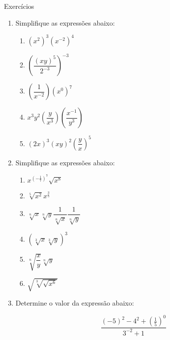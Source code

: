 \documentclass[14pt, aspectratio=169]{beamer}
\newcommand{\skipframe}{\vspace{10.0cm}}
\newcommand{\parenthesis}[1]{\left( #1 \right)}
\begin{document}
\begin{frame}[allowframebreaks]{Exercícios}
    \begin{enumerate}
        \item Simplifique as expressões abaixo:

        \begin{multicols}{2}
            \begin{enumerate}[a]
                \item $\parenthesis{x^2}^3 \parenthesis{x^{-2}}^4$
                \item $\parenthesis{\dfrac{\parenthesis{xy}^5}{2^{-3}}}^{-3}$
                \item $\parenthesis{\dfrac{1}{x^{-2}}} \parenthesis{x^0}^7$
                \item $x^3 y^2 \parenthesis{\dfrac{y}{x^3}} \parenthesis{\dfrac{x^{-1}}{y^3}}$
                \item $\parenthesis{2x}^3 \parenthesis{xy}^2 \parenthesis{\dfrac{y}{x}}^5$
            \end{enumerate}
        \end{multicols}

        \skipframe

        \item Simplifique as expressões abaixo:

        \begin{multicols}{2}
            \begin{enumerate}[a]
                \item $x^{\parenthesis{- \frac{1}{7}}^7} \sqrt{x^8}$
                \item $\sqrt[5]{x^2} x^{\frac{3}{5}}$
                \item $\sqrt[n]{x} \sqrt[n]{y} \dfrac{1}{\sqrt[n]{x}} \dfrac{1}{\sqrt[n]{y}}$
                \item $\parenthesis{\sqrt[3]{x} \sqrt[3]{y}}^3$
                \item $\sqrt[n]{\dfrac{x}{y}} \sqrt[n]{y}$
                \item $\sqrt{\sqrt[3]{\sqrt{x^6}}}$
            \end{enumerate}
        \end{multicols}

        \skipframe

        \item Determine o valor da expressão abaixo:

        \begin{equation*}
             \dfrac{(-5)^2 - 4^2 + \parenthesis{\frac{1}{5}}^0}{3^{-2} + 1}
        \end{equation*}


\end{enumerate}
\end{frame}
\end{document}

